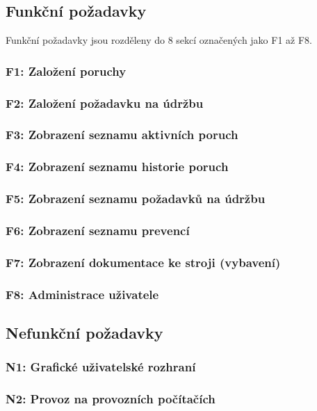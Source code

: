 \documentclass[thesis=M,czech]{FITthesis}[2012/06/26]
\begin{document}
\subsection{Funkční požadavky}
Funkční požadavky jsou rozděleny do 8 sekcí označených jako F1 až F8. 

\subsubsection{F1: Založení poruchy}
\subsubsection{F2: Založení požadavku na údržbu}
\subsubsection{F3: Zobrazení seznamu aktivních poruch}
\subsubsection{F4: Zobrazení seznamu historie poruch}
\subsubsection{F5: Zobrazení seznamu požadavků na údržbu}
\subsubsection{F6: Zobrazení seznamu prevencí}
\subsubsection{F7: Zobrazení dokumentace ke stroji (vybavení)}
\subsubsection{F8: Administrace uživatele}


\subsection{Nefunkční požadavky}

\subsubsection{N1: Grafické uživatelské rozhraní}
\subsubsection{N2: Provoz na provozních počítačích}
\end{document}
